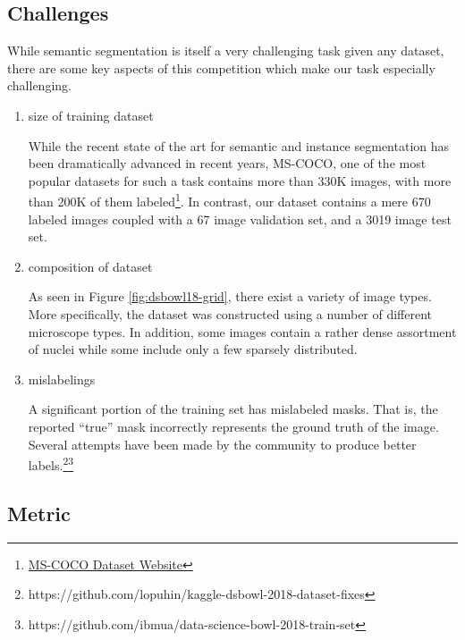\documentclass[paper=letter, fontsize=12pt]{article}
\numberwithin{equation}{section} %
\numberwithin{figure}{section} %
\numberwithin{table}{section} %
\begin{document}
\subsection{Challenges}

While semantic segmentation is itself a very challenging task given any 
dataset, there are some key aspects of this competition which make our task
especially challenging.
\begin{enumerate}
    \item size of training dataset

        While the recent state of the art for semantic and instance
        segmentation has been dramatically advanced in recent years, MS-COCO,
        one of the most popular datasets for such a task contains more than
        330K images, with more than 200K of them
        labeled\footnote{\href{http://cocodataset.org}{MS-COCO Dataset
        Website}}.  In contrast, our dataset contains a mere 670 labeled images
        coupled with a 67 image validation set, and a 3019 image test set.
    \item composition of dataset

        As seen in Figure \ref{fig:dsbowl18-grid}, there exist a variety of
        image types.  More specifically, the dataset was constructed using a 
        number of different microscope types.  In addition, some images contain
        a rather dense assortment of nuclei while some include only a few 
        sparsely distributed.
    \item mislabelings

        A significant portion of the training set has mislabeled masks.  That
        is, the reported ``true'' mask incorrectly represents the ground truth
        of the image.  Several attempts have been made by the community to
        produce better
        labels.\footnote{https://github.com/lopuhin/kaggle-dsbowl-2018-dataset-fixes}\footnote{https://github.com/ibmua/data-science-bowl-2018-train-set}
\end{enumerate}

\subsection{Metric}
\end{document}
